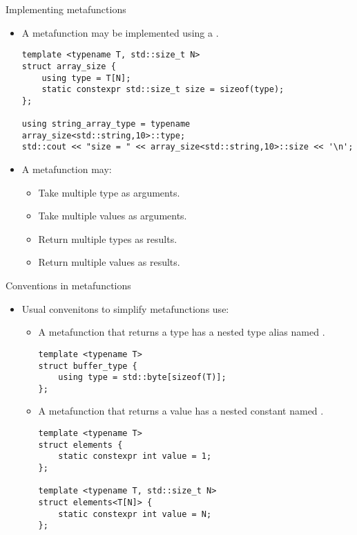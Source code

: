 \begin{frame}[t,fragile]{Implementing metafunctions}
\begin{itemize}
  \item A metafunction may be implemented using a .
\begin{lstlisting}
template <typename T, std::size_t N>
struct array_size {
    using type = T[N];
    static constexpr std::size_t size = sizeof(type);
};

using string_array_type = typename array_size<std::string,10>::type;
std::cout << "size = " << array_size<std::string,10>::size << '\n';
\end{lstlisting}

  \item A metafunction may:
    \begin{itemize}
      \item Take multiple type as arguments.
      \item Take multiple values as arguments.
      \item Return multiple types as results.
      \item Return multiple values as results.
    \end{itemize}
\end{itemize}
\end{frame}

\begin{frame}[t,fragile]{Conventions in metafunctions}
\begin{itemize}
  \item Usual convenitons to simplify metafunctions use:
    \begin{itemize}
      \item A metafunction that returns a type has a nested type alias named .
\begin{lstlisting}
template <typename T>
struct buffer_type {
    using type = std::byte[sizeof(T)];
};
\end{lstlisting}

      \item A metafunction that returns a value has a nested constant named .
\begin{lstlisting}
template <typename T>
struct elements {
    static constexpr int value = 1;
};

template <typename T, std::size_t N>
struct elements<T[N]> {
    static constexpr int value = N;
};
\end{lstlisting}

    \end{itemize}

\end{itemize}
\end{frame}

